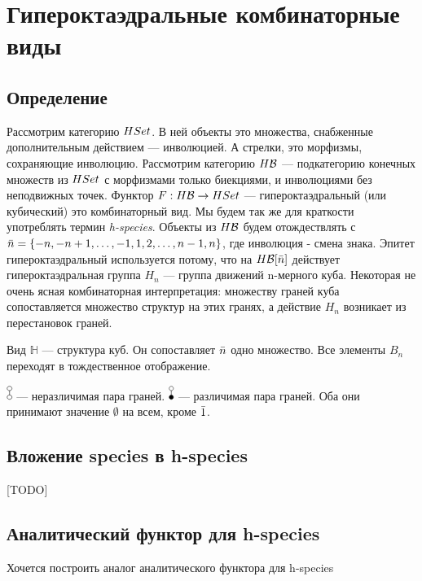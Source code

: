 \section{Гипероктаэдральные комбинаторные виды}
\subsection{Определение}
Рассмотрим категорию $HSet$. В ней объекты это множества, снабженные
дополнительным действием --- инволюцией. А стрелки, это морфизмы, сохраняющие инволюцию. 
Рассмотрим категорию $H\mathcal B$ --- подкатегорию конечных множеств из
$HSet$ с морфизмами только биекциями, и инволюциями без неподвижных точек.
Функтор $F:H\mathcal B \rightarrow HSet$ --- гипероктаэдральный (или кубический)
это комбинаторный вид. Мы будем так же для краткости употреблять термин
\emph{h-species}. Объекты из $H\mathcal B$ будем отождествлять с $\Bar n = \{-n, -n+1,
\dots, -1, 1, 2, \dots, n-1, n\}$, где инволюция - смена знака. Эпитет
гипероктаэдральный используется потому, что на $H\mathcal B[\Bar n]$ действует
гипероктаэдральная группа $H_n$ --- группа движений n-мерного куба.
Некоторая не очень ясная комбинаторная интерпретация: множеству граней куба
сопоставляется множество структур на этих гранях, а действие $H_n$ возникает из
перестановок граней.

\begin{example}
Вид $\mathbb H$ --- структура куб. Он сопоставляет $\Bar n$ одно множество. Все
элементы $B_n$ переходят в тождественное отображение.
\end{example}
\begin{example}
$\dA$ --- неразличимая пара граней. $\dB$ --- различимая пара граней. Оба они
принимают значение $\emptyset$ на всем, кроме $\Bar 1$.
\end{example}

\subsection{Вложение species в h-species}
[TODO]

\subsection{Аналитический функтор для h-species}
Хочется построить аналог аналитического функтора для h-species


